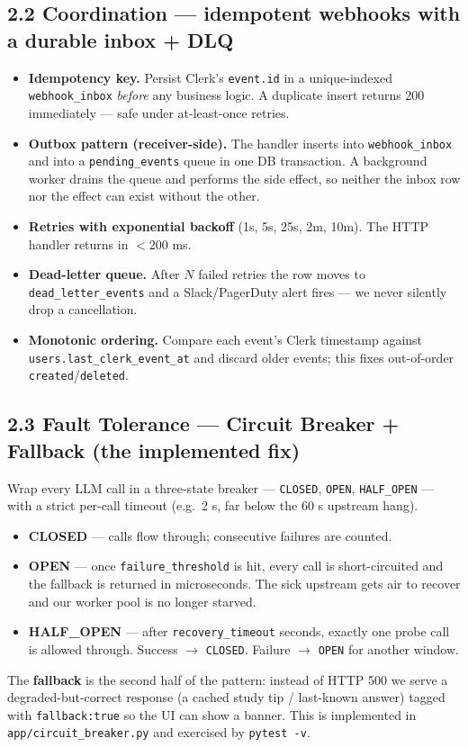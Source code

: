 \documentclass[11pt]{article}
\begin{document}
\subsection*{2.2 Coordination --- idempotent webhooks with a durable inbox + DLQ}
\begin{itemize}
  \item \textbf{Idempotency key.} Persist Clerk's \texttt{event.id} in a unique-indexed \texttt{webhook\_inbox}
  \emph{before} any business logic. A duplicate insert returns 200 immediately --- safe under at-least-once retries.
  \item \textbf{Outbox pattern (receiver-side).} The handler inserts into \texttt{webhook\_inbox} and into a
  \texttt{pending\_events} queue in one DB transaction. A background worker drains the queue and performs the
  side effect, so neither the inbox row nor the effect can exist without the other.
  \item \textbf{Retries with exponential backoff} (1s, 5s, 25s, 2m, 10m). The HTTP handler returns in \(<\)200 ms.
  \item \textbf{Dead-letter queue.} After $N$ failed retries the row moves to \texttt{dead\_letter\_events} and a
  Slack/PagerDuty alert fires --- we never silently drop a cancellation.
  \item \textbf{Monotonic ordering.} Compare each event's Clerk timestamp against
  \texttt{users.last\_clerk\_event\_at} and discard older events; this fixes out-of-order
  \texttt{created}/\texttt{deleted}.
\end{itemize}

\subsection*{2.3 Fault Tolerance --- Circuit Breaker + Fallback (the implemented fix)}
Wrap every LLM call in a three-state breaker --- \texttt{CLOSED}, \texttt{OPEN}, \texttt{HALF\_OPEN} --- with a strict
per-call timeout (e.g.\ 2 s, far below the 60 s upstream hang).
\begin{itemize}
  \item \textbf{CLOSED} --- calls flow through; consecutive failures are counted.
  \item \textbf{OPEN} --- once \texttt{failure\_threshold} is hit, every call is short-circuited and the fallback is
  returned in microseconds. The sick upstream gets air to recover and our worker pool is no longer starved.
  \item \textbf{HALF\_OPEN} --- after \texttt{recovery\_timeout} seconds, exactly one probe call is allowed through.
  Success $\rightarrow$ \texttt{CLOSED}. Failure $\rightarrow$ \texttt{OPEN} for another window.
\end{itemize}
The \textbf{fallback} is the second half of the pattern: instead of HTTP 500 we serve a degraded-but-correct response
(a cached study tip / last-known answer) tagged with \texttt{fallback:true} so the UI can show a banner. This is
implemented in \texttt{app/circuit\_breaker.py} and exercised by \texttt{pytest -v}.
\end{document}
